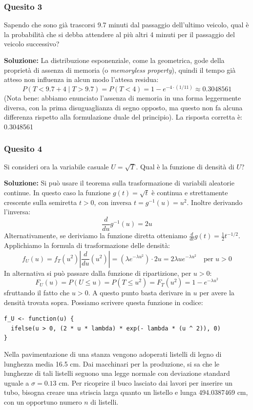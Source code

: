 \documentclass[12pt, a4paper]{article}
\begin{document}
\subsubsection*{Quesito 3}
Sapendo che sono già trascorsi 9.7 minuti dal passaggio dell’ultimo veicolo, qual è la probabilità che si debba attendere al più altri 4 minuti per il passaggio del veicolo successivo?

\textbf{Soluzione:}
La distribuzione esponenziale, come la geometrica, gode della proprietà di assenza di memoria (o \textit{memoryless property}), quindi il tempo già atteso non influenza in alcun modo l'attesa residua:
$$ P(T < 9.7+4 \mid T > 9.7) = P(T < 4) = 1 - e^{-4 \cdot (1/11)} \approx 0.3048561 $$
(Nota bene: abbiamo enunciato l’assenza di memoria in una forma leggermente diversa, con la prima disuguaglianza di segno opposto, ma questo non fa alcuna differenza rispetto alla formulazione duale del principio).
La risposta corretta è: 0.3048561

\newpage

\subsubsection*{Quesito 4}
Si consideri ora la variabile casuale $U = \sqrt{T}$. Qual è la funzione di densità di $U$?

\textbf{Soluzione:}
Si può usare il teorema sulla trasformazione di variabili aleatorie continue. In questo caso la funzione $g(t) = \sqrt{t}$ è continua e strettamente crescente sulla semiretta $t>0$, con inversa $t = g^{-1}(u) = u^2$. Inoltre derivando l'inversa:
$$ \frac{d}{du} g^{-1}(u) = 2u $$
Alternativamente, se deriviamo la funzione diretta otteniamo $\frac{d}{dt} g(t) = \frac{1}{2} t^{-1/2}$. 
Applichiamo la formula di trasformazione delle densità:
$$ f_U(u) = f_T(u^2) \left| \frac{d}{du}(u^2) \right| = (\lambda e^{-\lambda u^2}) \cdot 2u = 2\lambda u e^{-\lambda u^2} \quad \text{per } u>0 $$
In alternativa si può passare dalla funzione di ripartizione, per $u>0$:
$$ F_U(u) = P(U \leq u) = P(T \leq u^2) = F_T(u^2) = 1 - e^{-\lambda u^2} $$
sfruttando il fatto che $u>0$. A questo punto basta derivare in $u$ per avere la densità trovata sopra. 
Possiamo scrivere questa funzione in codice:
\begin{verbatim}
f_U <- function(u) {
  ifelse(u > 0, (2 * u * lambda) * exp(- lambda * (u ^ 2)), 0)
}
\end{verbatim}

\vspace{0.5cm}
\begin{tcolorbox}[colback=lightergray!10, colframe=tocsec, title=\textbf{Esercizio 6}]
Nella pavimentazione di una stanza vengono adoperati listelli di legno di lunghezza media 16.5 cm. Dai macchinari per la produzione, si sa che le lunghezze di tali listelli seguono una legge normale con deviazione standard uguale a $\sigma=0.13$ cm.
Per ricoprire il buco lasciato dai lavori per inserire un tubo, bisogna creare una striscia larga quanto un listello e lunga 494.0387469 cm, con un opportuno numero $n$ di listelli.
\end{tcolorbox}
\end{document}
